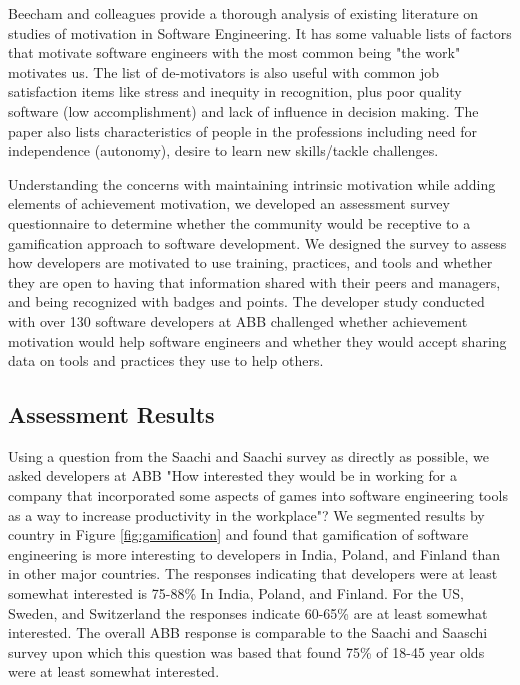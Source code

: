 \documentclass{sig-alternate}
\begin{document}
Beecham and colleagues provide a thorough analysis of existing literature on studies of motivation in Software Engineering\cite{wbsnipes:Beecham2008Motivation}. It has some valuable lists of factors that motivate software engineers with the most common being "the work" motivates us. The list of de-motivators is also useful with common job satisfaction items like stress and inequity in recognition, plus poor quality software (low accomplishment) and lack of influence in decision making. The paper also lists characteristics of people in the professions including need for independence (autonomy), desire to learn new skills/tackle challenges. 

Understanding the concerns with maintaining intrinsic motivation while adding elements of achievement motivation, we developed an assessment survey questionnaire to determine whether the community would be receptive to a gamification approach to software development.   We designed  the survey to assess how developers are motivated to use training, practices, and tools and whether they are open to having that information shared with their peers and managers, and being recognized with badges and points. The developer study conducted with over 130 software developers at ABB challenged whether achievement motivation would help software engineers and whether they would accept sharing data on tools and practices they use to help others.

\subsection{Assessment Results}

Using a question from the Saachi and Saachi survey\cite{wbsnipes:SaatchiGameification} as directly as possible, we asked developers at ABB "How interested they would be in working for a company that incorporated some aspects of games into software engineering tools as a way to increase productivity in the workplace"?  We segmented results by country in Figure \ref{fig:gamification} and found that gamification of software engineering is more interesting to developers in India, Poland, and Finland than in other major countries.  The responses indicating that developers were at least somewhat interested is 75-88\% In India, Poland, and Finland.  For the US, Sweden, and Switzerland the responses indicate 60-65\% are at least somewhat interested.  The overall ABB response is comparable to the Saachi and Saaschi survey\cite{wbsnipes:SaatchiGameification} upon which this question was based that found 75\% of 18-45 year olds were at least somewhat interested.  
\end{document}
